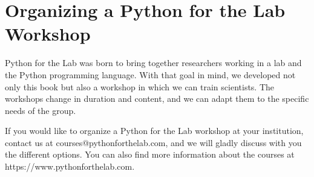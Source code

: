 \section{Organizing a Python for the Lab Workshop}
Python for the Lab was born to bring together researchers working in a lab and the Python programming language. With that goal in mind, we developed not only this book but also a workshop in which we can train scientists. The workshops change in duration and content, and we can adapt them to the specific needs of the group.

If you would like to organize a Python for the Lab workshop at your institution, contact us at courses@pythonforthelab.com, and we will gladly discuss with you the different options. You can also find more information about the courses at https://www.pythonforthelab.com.
